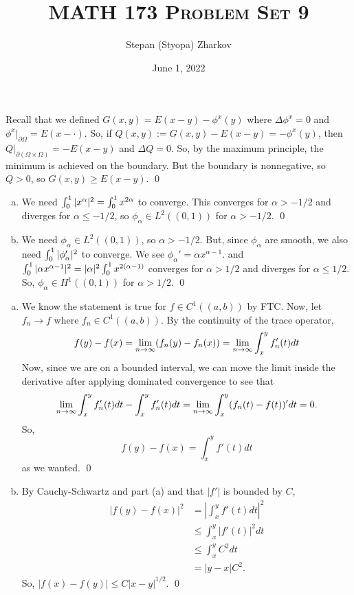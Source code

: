 \documentclass{article}
\title{\textsc{MATH 173 Problem Set 9}}
\author{Stepan (Styopa) Zharkov}
\date{June 1, 2022}
\renewcommand{\d}{\partial}
\begin{document}
\maketitle
{} 
\tri
\hop 
\solution 
Recall that we defined $G(x,y) = E(x-y) - \phi^x(y)$ where $\Delta \phi^x = 0$ and $\phi^x |_{\d
\Omega} = E(x - \cdot)$. So, if $Q(x,y) := G(x,y) - E(x-y) = -\phi^x(y)$, then $Q|_{\d(\Omega \times \Omega)} = -E(x-y)$ and $\Delta Q =0$. So, by the maximum principle, the minimum is achieved on the boundary. But the boundary is nonnegative, so  $Q> 0$, so $G(x,y) \ge E(x-y)$. \qed

\newpage
{} 
\tri
\hop 
\solution
\begin{enumerate}[(a)]
    \item We need $\int_0^1 |x^\alpha|^2 = \int_0^1 x^{2\alpha}$ to converge. This converges for $\alpha > -1/2$ and diverges for $\alpha \le -1/2$, so $\phi_\alpha \in L^2((0,1))$ for $\alpha > -1/2$. \qed
    \item We need $\phi_\alpha \in L^2((0,1))$, so $\alpha > -1/2$. But, since $\phi_\alpha$ are smooth, we also need $\int_0^1 |\phi_\alpha ' |^2$ to converge. We see $\phi_\alpha' = \alpha x^{\alpha-1}$. and $\int_0^1 |\alpha x^{\alpha-1}|^2 = |\alpha|^2\int_0^1 x^{2(\alpha-1)}$ converges for $\alpha > 1/2$ and diverges for $\alpha \le 1/2$. So, $\phi_\alpha \in H^1((0,1))$ for $\alpha > 1/2$. \qed
\end{enumerate}

\newpage
{} 
\tri
\hop 
\solution
\begin{enumerate}[(a)]
    \item We know the statement is true for $f \in C^1((a,b))$ by FTC. Now, let $f_n \to f$ where $f_n \in C^1((a,b))$. By the continuity of the trace operator, 
    \[f(y) - f(x) = {\lim_{n \to \infty}} (f_n(y)-f_n(x)) = {\lim_{n \to \infty}} \int_x^yf_n'(t)dt\]
    Now, since we are on a bounded interval, we can move the limit inside the derivative after applying dominated convergence to see that 
    \[{\lim_{n \to \infty}} \int_x^yf'_n(t)dt - \int_x^yf'_n(t)dt = {\lim_{n \to \infty}} \int_x^y(f_n(t) - f(t))'dt = 0.\]
    So, 
    \[f(y) - f(x) =  \int_x^yf'(t)dt\]
    as we wanted. \qed %
    \item By Cauchy-Schwartz and part (a) and that $|f'|$ is bounded by $C$, 
    \begin{align*}
        |f(y) - f(x)|^2 &= |\int_x^y f'(t)dt|^2\\
        &\le \int_x^y|f'(t)|^2 dt \\
        &\le \int_x^yC^2 dt \\
        &= |y-x|C^2.
    \end{align*}
    So, $|f(x) - f(y)| \le C|x-y|^{1/2}$. \qed
\end{enumerate}
\end{document}
